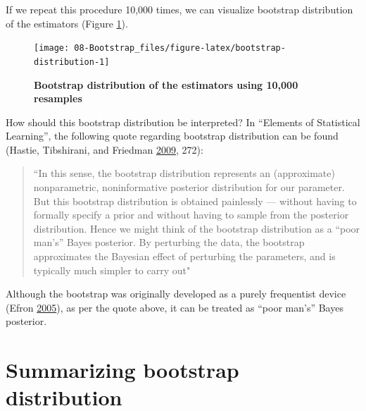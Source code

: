 \documentclass[
]{book}
\begin{document}
If we repeat this procedure 10,000 times, we can visualize bootstrap distribution of the estimators (Figure \ref{fig:bootstrap-distribution}).

\begin{figure}

{\centering \texttt{[image: 08-Bootstrap\_files/figure-latex/bootstrap-distribution-1]} 

}

\caption{\textbf{Bootstrap distribution of the estimators using 10,000 resamples}}\label{fig:bootstrap-distribution}
\end{figure}



How should this bootstrap distribution be interpreted? In ``Elements of Statistical Learning'', the following quote regarding bootstrap distribution can be found (Hastie, Tibshirani, and Friedman \protect\hyperlink{ref-hastieElementsStatisticalLearning2009}{2009}, 272):

\begin{quote}
``In this sense, the bootstrap distribution represents an (approximate) nonparametric, noninformative posterior distribution for our parameter. But this bootstrap distribution is obtained painlessly --- without having to formally specify a prior and without having to sample from the posterior distribution. Hence we might think of the bootstrap distribution as a ``poor man's'' Bayes posterior. By perturbing the data, the bootstrap approximates the Bayesian effect of perturbing the parameters, and is typically much simpler to carry out"
\end{quote}

Although the bootstrap was originally developed as a purely frequentist device (Efron \protect\hyperlink{ref-efronBayesiansFrequentistsScientists2005}{2005}), as per the quote above, it can be treated as ``poor man's'' Bayes posterior.

\hypertarget{summarizing-bootstrap-distribution}{%
\section{Summarizing bootstrap distribution}\label{summarizing-bootstrap-distribution}}
\end{document}
